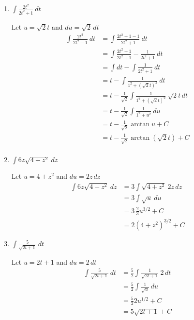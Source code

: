 \documentclass[12pt]{article}
\begin{document}
\begin{enumerate}
\item $\displaystyle\int \frac{2t^2}{2t^2+1} \ dt$

Let $u = \sqrt{2}t$ and $du = \sqrt{2}\,dt$
\begin{equation*}
\begin{aligned}
\int \frac{2t^2}{2t^2 + 1} \ dt &= \int \frac{2t^2+1-1}{2t^2+1} \ dt \\
&= \int \frac{2t^2+1}{2t^2+1}-\frac{1}{2t^2+1} \ dt \\
&= \int dt -\int\frac{1}{2t^2+1} \ dt \\
&= t - \int \frac{1}{1^2 + (\sqrt{2}t)^2} \ dt\\
&= t - \frac{1}{\sqrt{2}}\int \frac{1}{1^2 + (\sqrt{2}t)^2} \ \sqrt{2}t\,dt\\
&= t - \frac{1}{\sqrt{2}}\int \frac{1}{1^2 + u^2} \ du\\
&= t - \frac{1}{\sqrt{2}}\arctan u + C\\
&= t - \frac{1}{\sqrt{2}}\arctan(\sqrt{2}t) + C\\
\end{aligned}
\end{equation*}

\item $\displaystyle\int 6z \sqrt{4+z^2} \ dz$

Let $u = 4+z^2$ and $du = 2z\,dz$
\begin{equation*}
\begin{aligned}
\int 6z \sqrt{4+z^2} \ dz &= 3\int \sqrt{4+z^2} \ 2z\,dz \\
&= 3\int \sqrt{u} \ du \\
&= 3\,\frac{2}{3} u^{3/2} + C \\
&= 2 (4+z^2)^{3/2} + C
\end{aligned}
\end{equation*}

\item $\displaystyle\int \frac{5}{\sqrt{2t+1}} \ dt$

Let $u = 2t+1$ and $du = 2\,dt$
\begin{equation*}
\begin{aligned}
\int \frac{5}{\sqrt{2t+1}} \ dt &= \frac{5}{2}\int\frac{1}{\sqrt{2t+1}} \ 2\,dt \\
&= \frac{5}{2}\int\frac{1}{\sqrt{u}} \ du \\
&= \frac{5}{2}2u^{1/2}+ C \\
&= 5\sqrt{2t+1} + C
\end{aligned}
\end{equation*}
\end{enumerate}
\end{document}
